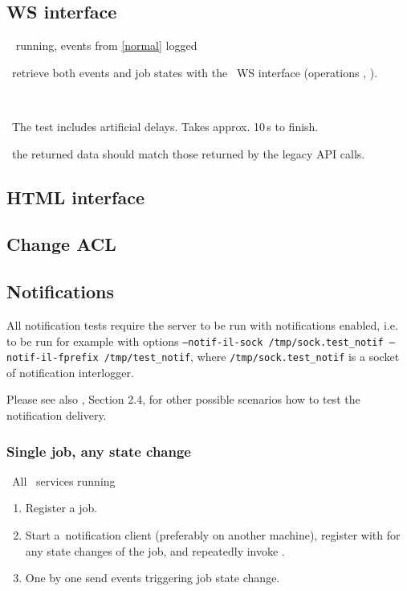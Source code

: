 \subsection{WS interface}
\req\  running, events from \ref{normal} logged

\what\ retrieve both events and job states with the \LB\ WS interface
(operations , ).

\how\ 

\note\ The test includes artificial delays. Takes approx. 10\,s to finish.

\result\ the returned data should match those returned by the legacy API calls.




\subsection{HTML interface}



\subsection{Change ACL}




\subsection{Notifications}

All notification tests require the \LB server to be run with notifications enabled,
i.e. to be run for example with options 
\texttt{--notif-il-sock /tmp/sock.test\_notif --notif-il-fprefix /tmp/test\_notif}, 
where \texttt{/tmp/sock.test\_notif} is a socket of notification interlogger.

Please see also \cite{lbug}, Section 2.4, for other possible scenarios how to test the notification delivery.


\subsubsection{Single job, any state change}
\label{notif1}
\req\ All \LB\ services running

\what
\begin{enumerate}
\item Register a job.
\item Start a~notification client (preferably on another machine),
register with  for any state changes of the job,
and repeatedly invoke .
\item One by one send events triggering job state change.
\end{enumerate}


